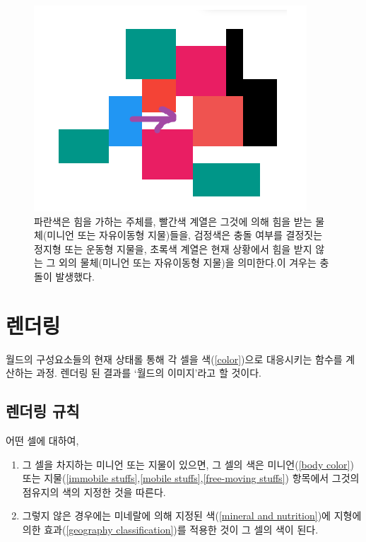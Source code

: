\documentclass[a4paper,12pt]{article}
\begin{document}
\begin{figure}[h]
	\centering
	\includegraphics[scale=0.7]{move3.png}
	\caption{ 파란색은 힘을 가하는 주체를, 빨간색 계열은 그것에 의해 힘을 받는 물체(미니언 또는 자유이동형 지물)들을, 검정색은 충돌 여부를 결정짓는 정지형 또는 운동형 지물을, 초록색 계열은 현재 상황에서 힘을 받지 않는 그 외의 물체(미니언 또는 자유이동형 지물)을 의미한다.이 겨우는 충돌이 발생했다.}
	\label{figure:move3}
\end{figure} 


\section{렌더링}\label{rendering}
월드의 구성요소들의 현재 상태롤 통해 각 셀을 색(\ref{color})으로 대응시키는 함수를 계산하는 과정. 렌더링 된 결과를 ‘월드의 이미지’라고 할 것이다. 
\subsection{렌더링 규칙}\label{rendering rule}
어떤 셀에 대하여,
\begin{enumerate} 
\item 그 셀을 차지하는 미니언 또는 지물이 있으면, 그 셀의 색은 미니언(\ref{body color}) 또는 지물(\ref{immobile stuffs},\ref{mobile stuffs},\ref{free-moving stuffs}) 항목에서 그것의 점유지의 색의 지정한 것을 따른다.  
\item 그렇지 않은 경우에는 미네랄에 의해 지정된 색(\ref{mineral and nutrition})에 지형에 의한 효과(\ref{geography classification})를 적용한 것이 그 셀의 색이 된다.  
\end{enumerate}

\end{document}
